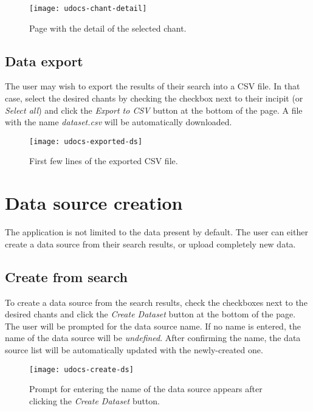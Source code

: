 \begin{figure}[h]
\centering
\texttt{[image: udocs-chant-detail]}
\caption{Page with the detail of the selected chant.}
\label{fig:chant-detail}
\end{figure}

\subsection{Data export}

The user may wish to export the results of their search into a CSV file. In that case, select the desired chants by checking the checkbox next to
their incipit (or \emph{Select all}) and click the \emph{Export to CSV} button at the bottom of the page. A file with the name \emph{dataset.csv}
will be automatically downloaded.

\begin{figure}[h]
\centering
\texttt{[image: udocs-exported-ds]}
\caption{First few lines of the exported CSV file.}
\label{fig:export-ex}
\end{figure}

\section{Data source creation}

The application is not limited to the data present by default. The user can either create a data source from their search results, or upload
completely new data.

\subsection{Create from search}

To create a data source from the search results, check the checkboxes next to the desired chants and click the \emph{Create Dataset} button at the bottom
of the page. The user will be prompted for the data source name. If no name is entered, the name of the data source will be \emph{undefined}. After confirming
the name, the data source list will be automatically updated with the newly-created one.

\begin{figure}[h]
\centering
\texttt{[image: udocs-create-ds]}
\caption{Prompt for entering the name of the data source appears after clicking the \emph{Create Dataset} button.}
\label{fig:create-ds}
\end{figure}

